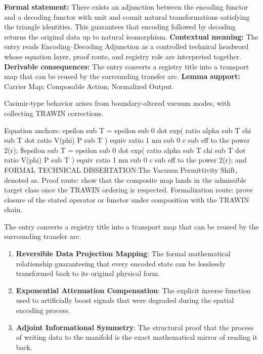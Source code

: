 \begingroup\footnotesize\setlength{\emergencystretch}{3em}\sloppy
\textbf{Formal statement:} There exists an adjunction between the encoding functor and a decoding functor with unit and counit natural transformations satisfying the triangle identities. This guarantees that encoding followed by decoding returns the original data up to natural isomorphism. \textbf{Contextual meaning:} The entry reads Encoding--Decoding Adjunction as a controlled technical headword whose equation layer, proof route, and registry role are interpreted together. \textbf{Derivable consequences:} The entry converts a registry title into a transport map that can be reused by the surrounding transfer arc. \textbf{Lemma support:} Carrier Map; Composable Action; Normalized Output.\par
\endgroup

Casimir-type behavior arises from boundary-altered vacuum modes, with collecting TRAWIN corrections.

Equation anchors: epsilon sub T = epsilon sub 0 dot exp( ratio alpha sub T chi sub T dot ratio V(phi) P sub T ) equiv ratio 1 mu sub 0 c sub eff to the power 2(r); \$epsilon sub T = epsilon sub 0 dot exp( ratio alpha sub T chi sub T dot ratio V(phi) P sub T ) equiv ratio 1 mu sub 0 c sub eff to the power 2(r); and FORMAL TECHNICAL DISSERTATION:The Vacuum Permittivity Shift, denoted as. Proof route: show that the composite map lands in the admissible target class once the TRAWIN ordering is respected. Formalization route: prove closure of the stated operator or functor under composition with the TRAWIN chain.

The entry converts a registry title into a transport map that can be reused by the surrounding transfer arc.
\endgroup

\begin{enumerate}[leftmargin=1.6em,itemsep=6pt,topsep=4pt]
\item \textbf{Reversible Data Projection Mapping}: The formal mathematical relationship guaranteeing that every encoded state can be losslessly transformed back to its original physical form.
\item \textbf{Exponential Attenuation Compensation}: The explicit inverse function used to artificially boost signals that were degraded during the spatial encoding process.
\item \textbf{Adjoint Informational Symmetry}: The structural proof that the process of writing data to the manifold is the exact mathematical mirror of reading it back.
\end{enumerate}

